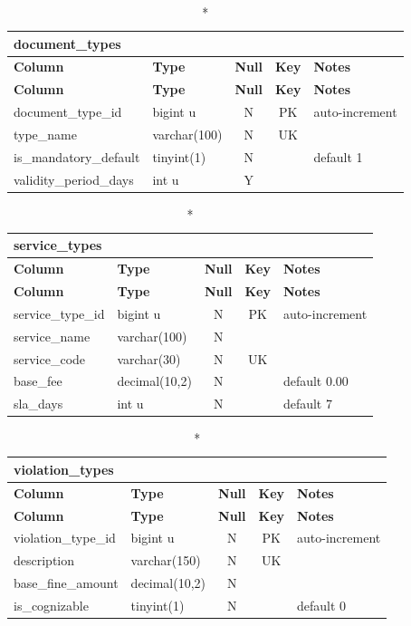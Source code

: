 \vspace{-0.4em}
\begin{longtable}{@{}p{3.4cm}p{2.9cm}c c p{5.6cm}@{}}
\caption*{\textbf{document\_\allowbreak{}types}}\\
\toprule \textbf{Column} & \textbf{Type} & \textbf{Null} & \textbf{Key} & \textbf{Notes} \\ \midrule \endfirsthead
\toprule \textbf{Column} & \textbf{Type} & \textbf{Null} & \textbf{Key} & \textbf{Notes} \\ \midrule \endhead
\bottomrule \endlastfoot
document\_\allowbreak{}type\_\allowbreak{}id & bigint u & N & PK & auto-increment \\
type\_\allowbreak{}name & varchar(100) & N & UK &  \\
is\_\allowbreak{}mandatory\_\allowbreak{}default & tinyint(1) & N &  & default 1 \\
validity\_\allowbreak{}period\_\allowbreak{}days & int u & Y &  &  \\
\end{longtable}
\vspace{-0.4em}
\begin{longtable}{@{}p{3.4cm}p{2.9cm}c c p{5.6cm}@{}}
\caption*{\textbf{service\_\allowbreak{}types}}\\
\toprule \textbf{Column} & \textbf{Type} & \textbf{Null} & \textbf{Key} & \textbf{Notes} \\ \midrule \endfirsthead
\toprule \textbf{Column} & \textbf{Type} & \textbf{Null} & \textbf{Key} & \textbf{Notes} \\ \midrule \endhead
\bottomrule \endlastfoot
service\_\allowbreak{}type\_\allowbreak{}id & bigint u & N & PK & auto-increment \\
service\_\allowbreak{}name & varchar(100) & N &  &  \\
service\_\allowbreak{}code & varchar(30) & N & UK &  \\
base\_\allowbreak{}fee & decimal(10,2) & N &  & default 0.00 \\
sla\_\allowbreak{}days & int u & N &  & default 7 \\
\end{longtable}
\vspace{-0.4em}
\begin{longtable}{@{}p{3.4cm}p{2.9cm}c c p{5.6cm}@{}}
\caption*{\textbf{violation\_\allowbreak{}types}}\\
\toprule \textbf{Column} & \textbf{Type} & \textbf{Null} & \textbf{Key} & \textbf{Notes} \\ \midrule \endfirsthead
\toprule \textbf{Column} & \textbf{Type} & \textbf{Null} & \textbf{Key} & \textbf{Notes} \\ \midrule \endhead
\bottomrule \endlastfoot
violation\_\allowbreak{}type\_\allowbreak{}id & bigint u & N & PK & auto-increment \\
description & varchar(150) & N & UK &  \\
base\_\allowbreak{}fine\_\allowbreak{}amount & decimal(10,2) & N &  &  \\
is\_\allowbreak{}cognizable & tinyint(1) & N &  & default 0 \\
\end{longtable}
